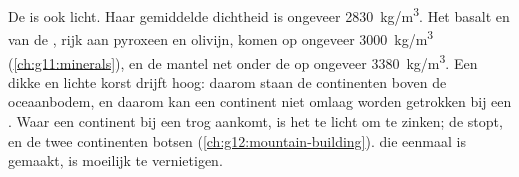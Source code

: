 De  is ook licht. Haar gemiddelde dichtheid is ongeveer
\qty{2830}{kg/m^3}. Het basalt en  van de , rijk aan
pyroxeen en olivijn, komen op ongeveer \qty{3000}{kg/m^3}
(\cref{ch:g11:minerals}), en de mantel net onder de  op ongeveer
\qty{3380}{kg/m^3}. Een dikke en lichte korst drijft hoog: daarom
staan de continenten boven de oceaanbodem, en daarom kan een continent niet
omlaag worden getrokken bij een . Waar een continent bij een trog aankomt, is het te
licht om te zinken; de  stopt, en de twee continenten botsen
(\cref{ch:g12:mountain-building}).  die eenmaal is gemaakt, is moeilijk te
vernietigen.

